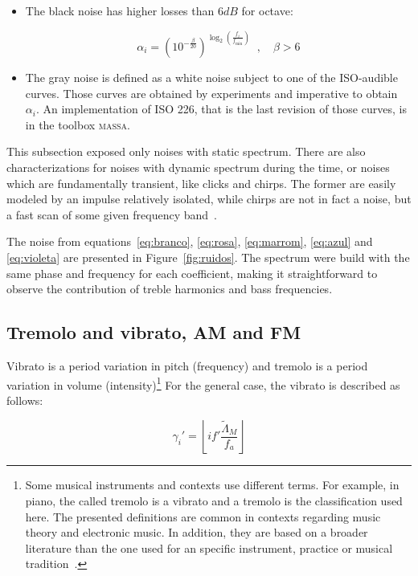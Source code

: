 \documentclass[
 aip,
 jmp,
 amsmath,amssymb,
 reprint,
]{revtex4-1}
\newcommand{\massa}{{\large \textsc{massa}}}
\begin{document}
\begin{itemize}
 \item The black noise has higher losses than $6dB$ for octave:

\begin{equation}\label{eq:preto}
 \alpha_i=(10^{-\frac{\beta}{20}})^{\log _2 \left( \frac{f_i}{f_{\text{min}}} \right )}\;\;, \quad \beta > 6
\end{equation}

 \item The gray noise is defined as a white noise subject to one of the ISO-audible curves. Those curves are obtained by experiments and imperative to obtain $\alpha_i$. An implementation of ISO 226, that is the last revision of those curves, is in the toolbox \massa.\cite{MASSA}

\end{itemize}

This subsection exposed only noises with static spectrum. There are also characterizations for noises with dynamic spectrum during the time, or noises which are fundamentally transient, like clicks and chirps. The former are easily modeled by an impulse relatively isolated, while chirps are not in fact a noise, but a fast scan of some given frequency band~\cite{Cook}.

The noise from equations~\ref{eq:branco}, \ref{eq:rosa}, \ref{eq:marrom},
\ref{eq:azul} and \ref{eq:violeta} are presented in Figure~\ref{fig:ruidos}. The spectrum were build with the same phase and frequency for each coefficient, making it straightforward to observe the contribution of treble harmonics and bass frequencies.


\subsection{Tremolo and vibrato, AM and FM}\label{subsec:tvaf}

Vibrato is a period variation in pitch (frequency) and tremolo is a period variation in volume (intensity)\footnote{Some musical instruments and contexts use different terms. For example, in piano, the called tremolo is a vibrato and a tremolo is the classification used here. The presented definitions are common in contexts regarding music theory and electronic music. In addition, they are based on a broader literature than the one used for an specific instrument, practice or musical tradition~\cite{Lacerda,Harmonia}.}
For the general case, the vibrato is described as follows:

\begin{equation}\label{vbrGamma}
 \gamma_i'=\left \lfloor i f' \frac{\widetilde{\Lambda}_M}{f_a} \right \rfloor
\end{equation}
\end{document}
